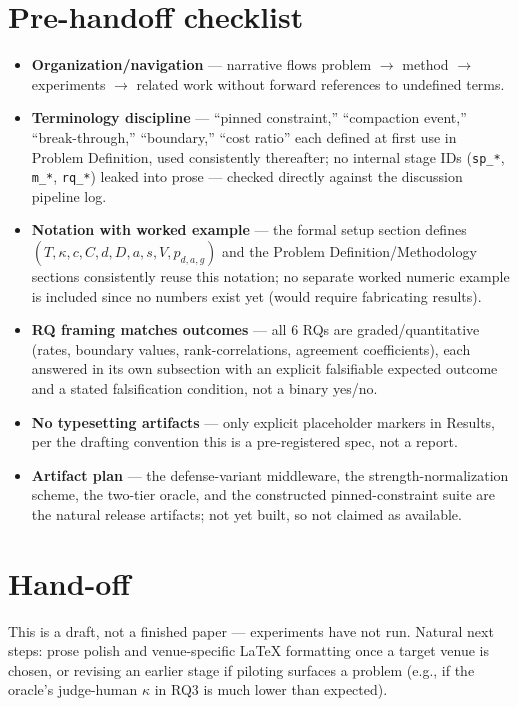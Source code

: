 \documentclass[11pt]{article}
\begin{document}
\section*{Pre-handoff checklist}
\begin{itemize}[leftmargin=1.4em]
\item \textbf{Organization/navigation} --- narrative flows problem $\to$ method $\to$ experiments $\to$ related work without forward references to undefined terms.
\item \textbf{Terminology discipline} --- ``pinned constraint,'' ``compaction event,'' ``break-through,'' ``boundary,'' ``cost ratio'' each defined at first use in Problem Definition, used consistently thereafter; no internal stage IDs (\texttt{sp\_*}, \texttt{m\_*}, \texttt{rq\_*}) leaked into prose --- checked directly against the discussion pipeline log.
\item \textbf{Notation with worked example} --- the formal setup section defines $(T, \kappa, c, C, d, D, a, s, V, p_{d,a,g})$ and the Problem Definition/Methodology sections consistently reuse this notation; no separate worked numeric example is included since no numbers exist yet (would require fabricating results).
\item \textbf{RQ framing matches outcomes} --- all 6 RQs are graded/quantitative (rates, boundary values, rank-correlations, agreement coefficients), each answered in its own subsection with an explicit falsifiable expected outcome and a stated falsification condition, not a binary yes/no.
\item \textbf{No typesetting artifacts} --- only explicit placeholder markers in Results, per the drafting convention this is a pre-registered spec, not a report.
\item \textbf{Artifact plan} --- the defense-variant middleware, the strength-normalization scheme, the two-tier oracle, and the constructed pinned-constraint suite are the natural release artifacts; not yet built, so not claimed as available.
\end{itemize}

\section*{Hand-off}
This is a draft, not a finished paper --- experiments have not run. Natural next steps: prose polish and venue-specific LaTeX formatting once a target venue is chosen, or revising an earlier stage if piloting surfaces a problem (e.g., if the oracle's judge-human $\kappa$ in RQ3 is much lower than expected).
\end{document}

